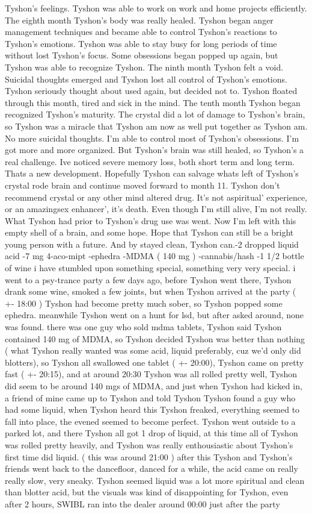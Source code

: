\documentclass[12pt]{book}
\begin{document}
Tyshon's feelings. Tyshon was able to work on work and home projects efficiently. The eighth month Tyshon's body was really healed. Tyshon began anger management techniques and became able to control Tyshon's reactions to Tyshon's emotions. Tyshon was able to stay busy for long periods of time without lost Tyshon's focus. Some obsessions began popped up again, but Tyshon was able to recognize Tyshon. The ninth month Tyshon felt a void. Suicidal thoughts emerged and Tyshon lost all control of Tyshon's emotions. Tyshon seriously thought about used again, but decided not to. Tyshon floated through this month, tired and sick in the mind. The tenth month Tyshon began recognized Tyshon's maturity. The crystal did a lot of damage to Tyshon's brain, so Tyshon was a miracle that Tyshon am now as well put together as Tyshon am. No more suicidal thoughts. I'm able to control most of Tyshon's obsessions. I'm got more and more organized. But Tyshon's brain was still healed, so Tyshon's a real challenge. Ive noticed severe memory loss, both short term and long term. Thats a new development. Hopefully Tyshon can salvage whats left of Tyshon's crystal rode brain and continue moved forward to month 11. Tyshon don't recommend crystal or any other mind altered drug. It's not aspiritual' experience, or an amazingsex enhancer', it's death. Even though I'm still alive, I'm not really. What Tyshon had prior to Tyshon's drug use was went. Now I'm left with this empty shell of a brain, and some hope. Hope that Tyshon can still be a bright young person with a future. And by stayed clean, Tyshon can.-2 dropped liquid acid -7 mg 4-aco-mipt -ephedra -MDMA ( 140 mg ) -cannabis/hash -1 1/2 bottle of wine i have stumbled upon something special, something very very special. i went to a psy-trance party a few days ago, before Tyshon went there, Tyshon drank some wine, smoked a few joints, but when Tyshon arrived at the party ( +- 18:00 ) Tyshon had become pretty much sober, so Tyshon popped some ephedra. meanwhile Tyshon went on a hunt for lsd, but after asked around, none was found. there was one guy who sold mdma tablets, Tyshon said Tyshon contained 140 mg of MDMA, so Tyshon decided Tyshon was better than nothing ( what Tyshon really wanted was some acid, liquid preferably, cuz we'd only did blotters), so Tyshon all swallowed one tablet ( +- 20:00), Tyshon came on pretty fast ( +- 20:15), and at around 20:30 Tyshon was all rolled pretty well, Tyshon did seem to be around 140 mgs of MDMA, and just when Tyshon had kicked in, a friend of mine came up to Tyshon and told Tyshon Tyshon found a guy who had some liquid, when Tyshon heard this Tyshon freaked, everything seemed to fall into place, the evened seemed to become perfect. Tyshon went outside to a parked lot, and there Tyshon all got 1 drop of liquid, at this time all of Tyshon was rolled pretty heavily, and Tyshon was really enthousiastic about Tyshon's first time did liquid. ( this was around 21:00 ) after this Tyshon and Tyshon's friends went back to the dancefloor, danced for a while, the acid came on really really slow, very sneaky. Tyshon seemed liquid was a lot more spiritual and clean than blotter acid, but the visuals was kind of disappointing for Tyshon, even after 2 hours, SWIBL ran into the dealer around 00:00 just after the party 
\end{document}

